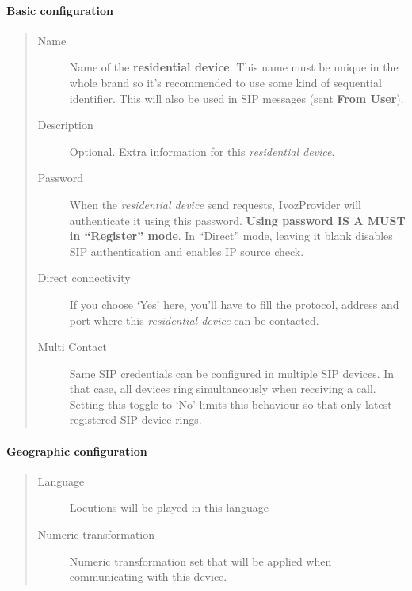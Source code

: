 \documentclass[letterpaper,10pt,spanish]{sphinxmanual}
\begin{document}
\paragraph{Basic configuration}
\label{administration_portal/client/residential/residential_devices:basic-configuration}\begin{quote}
\begin{description}
\item[{Name}] \leavevmode
Name of the \textbf{residential device}. This name must be unique in the whole brand so
it's recommended to use some kind of sequential identifier. This will also be used
in SIP messages (sent \textbf{From User}).

\item[{Description}] \leavevmode
Optional. Extra information for this \emph{residential device}.

\item[{Password}] \leavevmode
When the \emph{residential device} send requests, IvozProvider will authenticate it using
this password. \textbf{Using password IS A MUST in ``Register'' mode}. In ``Direct'' mode,
leaving it blank disables SIP authentication and enables IP source check.

\item[{Direct connectivity}] \leavevmode
If you choose `Yes' here, you'll have to fill the protocol, address and
port where this \emph{residential device} can be contacted.

\item[{Multi Contact}] \leavevmode
Same SIP credentials can be configured in multiple SIP devices. In that case, all devices ring
simultaneously when receiving a call. Setting this toggle to `No' limits this behaviour so that
only latest registered SIP device rings.

\end{description}
\end{quote}


\paragraph{Geographic configuration}
\label{administration_portal/client/residential/residential_devices:geographic-configuration}\begin{quote}
\begin{description}
\item[{Language}] \leavevmode
Locutions will be played in this language

\item[{Numeric transformation}] \leavevmode
Numeric transformation set that will be applied when communicating with this device.

\end{description}
\end{quote}
\end{document}
